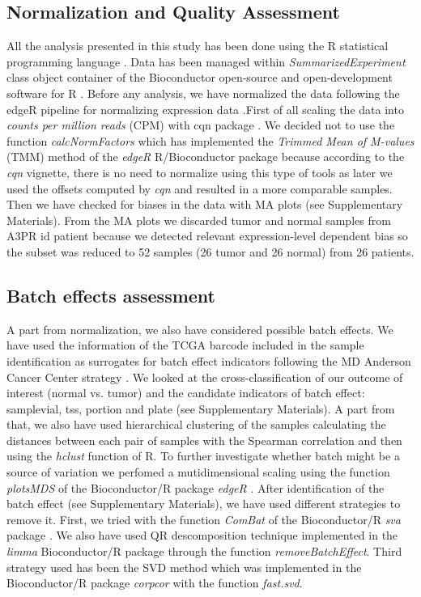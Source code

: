 \documentclass[9pt,twocolumn,twoside]{gsajnl}
\begin{document}
\subsection*{Normalization and Quality Assessment}
All the analysis presented in this study has been done using the R statistical programming language \citep{R}. Data has been managed within \textit{SummarizedExperiment} class object container \citep{SummarizedExperiment} of the Bioconductor open-source and open-development software for R \citep{Gentleman2004}. Before any analysis, we have normalized the data following the edgeR pipeline for normalizing expression data \citep{Robinson2010}.First of all scaling the data into \textit{counts per million reads} (CPM) with cqn package \citep{Hansen2012}. We decided not to use the function \textit{calcNormFactors} which has implemented the \textit{Trimmed Mean of M-values} (TMM) method of the \textit{edgeR} R/Bioconductor package \citep{Robinson2010a} because according to the \textit{cqn} vignette, there is no need to normalize using this type of tools as later we used the offsets computed by \textit{cqn} \citep{Hansen2012} and resulted in a more comparable samples. 
Then we have checked for biases in the data with MA plots (see Supplementary Materials). From the MA plots we discarded tumor and normal samples from  A3PR id patient because we detected relevant expression-level dependent bias so the subset was reduced to 52 samples (26 tumor and 26 normal) from 26 patients.

\subsection*{Batch effects assessment}
A part from normalization, we also have considered possible batch effects. We have used the information of the TCGA barcode included in the sample identification as surrogates for batch effect indicators following the MD Anderson Cancer Center strategy \citep{batch}. We looked at the cross-classification of our outcome of interest (normal vs. tumor) and the candidate indicators of batch effect: samplevial, tss, 
portion and plate (see Supplementary Materials). A part from that, we also have used hierarchical clustering of the samples calculating the distances between each pair of samples with the Spearman correlation and then using the \textit{hclust} function of R. To further investigate whether batch might be a source of variation we perfomed a mutidimensional scaling using the function \textit{plotsMDS} of the Bioconductor/R package \textit{edgeR} \citep{Robinson2010}. After identification of the batch effect (see Supplementary Materials), we have used different strategies to remove it. First, we tried with the function \textit{ComBat} of the Bioconductor/R \textit{sva} package \citep{sva}. We also have used QR descomposition technique implemented in the \textit{limma} Bioconductor/R package \citep{limma} through the function \textit{removeBatchEffect}. Third strategy used has been the SVD method \citep{Alter2000} which was implemented in the Bioconductor/R package \textit{corpcor} \citep{corpcor} with the function \textit{fast.svd}.
\end{document}
